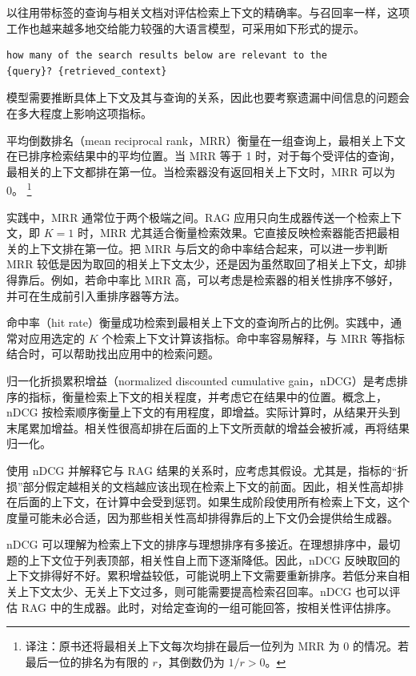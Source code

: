 \begin{practicaltip}
以往用带标签的查询与相关文档对评估检索上下文的精确率。与召回率一样，这项工作也越来越多地交给能力较强的大语言模型，可采用如下形式的提示。
\begin{lstlisting}[nolol=true]
how many of the search results below are relevant to the
{query}? {retrieved_context}
\end{lstlisting}
模型需要推断具体上下文及其与查询的关系，因此也要考察遗漏中间信息的问题会在多大程度上影响这项指标。
\end{practicaltip}

平均倒数排名（mean reciprocal rank，MRR）衡量在一组查询上，最相关上下文在已排序检索结果中的平均位置。当 MRR 等于 1 时，对于每个受评估的查询，最相关的上下文都排在第一位。当检索器没有返回相关上下文时，MRR 可以为 0。%
\footnote{译注：原书还将最相关上下文每次均排在最后一位列为 MRR 为 0 的情况。若最后一位的排名为有限的 $r$，其倒数仍为 $1/r>0$。}

\begin{practicaltip}
实践中，MRR 通常位于两个极端之间。RAG 应用只向生成器传送一个检索上下文，即 $K=1$ 时，MRR 尤其适合衡量检索效果。它直接反映检索器能否把最相关的上下文排在第一位。把 MRR 与后文的命中率结合起来，可以进一步判断 MRR 较低是因为取回的相关上下文太少，还是因为虽然取回了相关上下文，却排得靠后。例如，若命中率比 MRR 高，可以考虑是检索器的相关性排序不够好，并可在生成前引入重排序器等方法。
\end{practicaltip}

命中率（hit rate）衡量成功检索到最相关上下文的查询所占的比例。实践中，通常对应用选定的 $K$ 个检索上下文计算该指标。命中率容易解释，与 MRR 等指标结合时，可以帮助找出应用中的检索问题。

归一化折损累积增益（normalized discounted cumulative gain，nDCG）是考虑排序的指标，衡量检索上下文的相关程度，并考虑它在结果中的位置。概念上，nDCG 按检索顺序衡量上下文的有用程度，即增益。实际计算时，从结果开头到末尾累加增益。相关性很高却排在后面的上下文所贡献的增益会被折减，再将结果归一化。

使用 nDCG 并解释它与 RAG 结果的关系时，应考虑其假设。尤其是，指标的“折损”部分假定越相关的文档越应该出现在检索上下文的前面。因此，相关性高却排在后面的上下文，在计算中会受到惩罚。如果生成阶段使用所有检索上下文，这个度量可能未必合适，因为那些相关性高却排得靠后的上下文仍会提供给生成器。

\begin{practicaltip}
nDCG 可以理解为检索上下文的排序与理想排序有多接近。在理想排序中，最切题的上下文位于列表顶部，相关性自上而下逐渐降低。因此，nDCG 反映取回的上下文排得好不好。累积增益较低，可能说明上下文需要重新排序。若低分来自相关上下文太少、无关上下文过多，则可能需要提高检索召回率。nDCG 也可以评估 RAG 中的生成器。此时，对给定查询的一组可能回答，按相关性评估排序。
\end{practicaltip}


